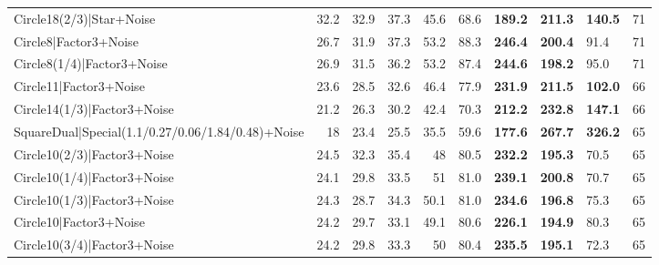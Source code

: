\begin{tabular}{lrrrrllllr}
 Circle18(2/3)|Star+Noise                             &         32.2 &         32.9 &         37.3 &            45.6 & 68.6           & \textbf{189.2} & \textbf{211.3} & \textbf{140.5} &           71 \\
 Circle8|Factor3+Noise                                &         26.7 &         31.9 &         37.3 &            53.2 & 88.3           & \textbf{246.4} & \textbf{200.4} & 91.4           &           71 \\
 Circle8(1/4)|Factor3+Noise                           &         26.9 &         31.5 &         36.2 &            53.2 & 87.4           & \textbf{244.6} & \textbf{198.2} & 95.0           &           71 \\
 Circle11|Factor3+Noise                               &         23.6 &         28.5 &         32.6 &            46.4 & 77.9           & \textbf{231.9} & \textbf{211.5} & \textbf{102.0} &           66 \\
 Circle14(1/3)|Factor3+Noise                          &         21.2 &         26.3 &         30.2 &            42.4 & 70.3           & \textbf{212.2} & \textbf{232.8} & \textbf{147.1} &           66 \\
 SquareDual|Special(1.1/0.27/0.06/1.84/0.48)+Noise    &         18   &         23.4 &         25.5 &            35.5 & 59.6           & \textbf{177.6} & \textbf{267.7} & \textbf{326.2} &           65 \\
 Circle10(2/3)|Factor3+Noise                          &         24.5 &         32.3 &         35.4 &            48   & 80.5           & \textbf{232.2} & \textbf{195.3} & 70.5           &           65 \\
 Circle10(1/4)|Factor3+Noise                          &         24.1 &         29.8 &         33.5 &            51   & 81.0           & \textbf{239.1} & \textbf{200.8} & 70.7           &           65 \\
 Circle10(1/3)|Factor3+Noise                          &         24.3 &         28.7 &         34.3 &            50.1 & 81.0           & \textbf{234.6} & \textbf{196.8} & 75.3           &           65 \\
 Circle10|Factor3+Noise                               &         24.2 &         29.7 &         33.1 &            49.1 & 80.6           & \textbf{226.1} & \textbf{194.9} & 80.3           &           65 \\
 Circle10(3/4)|Factor3+Noise                          &         24.2 &         29.8 &         33.3 &            50   & 80.4           & \textbf{235.5} & \textbf{195.1} & 72.3           &           65 \\

\end{tabular}
